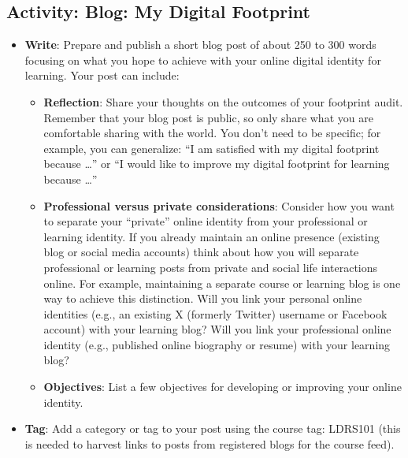 \documentclass[
  letterpaper,
  DIV=11,
  numbers=noendperiod]{scrreprt}
\providecommand{\tightlist}{%
  \setlength{\itemsep}{0pt}\setlength{\parskip}{0pt}}\usepackage{longtable,booktabs,array}
\begin{document}
\subsection{Activity: Blog: My Digital
Footprint}\label{activity-blog-my-digital-footprint}

\begin{tcolorbox}[enhanced jigsaw, toprule=.15mm, colback=white, colframe=quarto-callout-note-color-frame, bottomtitle=1mm, leftrule=.75mm, coltitle=black, titlerule=0mm, rightrule=.15mm, colbacktitle=quarto-callout-note-color!10!white, left=2mm, title={Learning Activity}, opacitybacktitle=0.6, opacityback=0, breakable, toptitle=1mm, arc=.35mm, bottomrule=.15mm]

\begin{itemize}
\tightlist
\item
  \textbf{Write}: Prepare and publish a short blog post of about 250 to
  300 words focusing on what you hope to achieve with your online
  digital identity for learning. Your post can include:

  \begin{itemize}
  \tightlist
  \item
    \textbf{Reflection}: Share your thoughts on the outcomes of your
    footprint audit. Remember that your blog post is public, so only
    share what you are comfortable sharing with the world. You don't
    need to be specific; for example, you can generalize: ``I am
    satisfied with my digital footprint because \ldots{}'' or ``I would
    like to improve my digital footprint for learning because \ldots{}''
  \item
    \textbf{Professional versus private considerations}: Consider how
    you want to separate your ``private'' online identity from your
    professional or learning identity. If you already maintain an online
    presence (existing blog or social media accounts) think about how
    you will separate professional or learning posts from private and
    social life interactions online. For example, maintaining a separate
    course or learning blog is one way to achieve this distinction. Will
    you link your personal online identities (e.g., an existing X
    (formerly Twitter) username or Facebook account) with your learning
    blog? Will you link your professional online identity (e.g.,
    published online biography or resume) with your learning blog?
  \item
    \textbf{Objectives}: List a few objectives for developing or
    improving your online identity.
  \end{itemize}
\item
  \textbf{Tag}: Add a category or tag to your post using the course tag:
  LDRS101 (this is needed to harvest links to posts from registered
  blogs for the course feed).
\end{itemize}


\end{tcolorbox}
\end{document}
